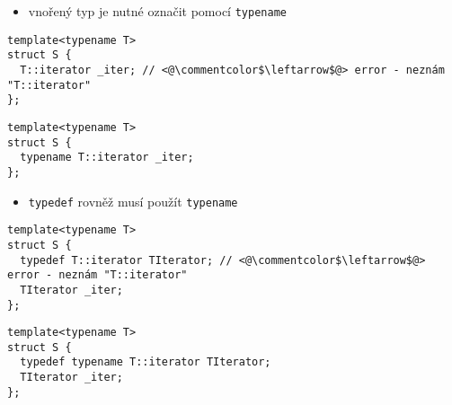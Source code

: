 \begin{frame}[fragile]
\begin{block}{}
\begin{itemize}
\item vnořený typ je nutné označit pomocí \lstinline|typename|
\end{itemize}
\end{block}


\begin{noblock}
\begin{lstlisting}
template<typename T>
struct S {
  T::iterator _iter; // <@\commentcolor$\leftarrow$@> error - neznám "T::iterator"
};
\end{lstlisting}
\end{noblock}

\begin{yesblock}
\begin{lstlisting}
template<typename T>
struct S {
  typename T::iterator _iter;
};
\end{lstlisting}
\end{yesblock}
\end{frame}











\begin{frame}[fragile]
\begin{block}{}
\begin{itemize}
\item \lstinline|typedef| rovněž musí použít \lstinline|typename|
\end{itemize}
\end{block}

\begin{noblock}
\begin{lstlisting}
template<typename T>
struct S {
  typedef T::iterator TIterator; // <@\commentcolor$\leftarrow$@> error - neznám "T::iterator"
  TIterator _iter;
};
\end{lstlisting}
\end{noblock}

\begin{yesblock}
\begin{lstlisting}
template<typename T>
struct S {
  typedef typename T::iterator TIterator;
  TIterator _iter;
};
\end{lstlisting}
\end{yesblock}
\end{frame}










